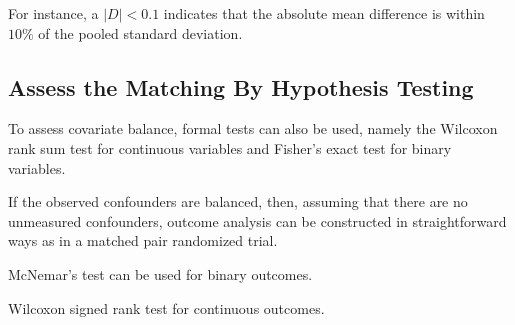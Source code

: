 For instance, a $|D| < 0.1$ indicates that the absolute mean
difference is within $10\%$ of the pooled standard deviation.

\subsection{Assess the Matching By Hypothesis Testing}
To assess covariate balance, formal tests can also be used,
namely the Wilcoxon rank sum test for continuous variables and
Fisher's exact test for binary variables.

If the observed confounders are balanced, then, assuming that
there are no unmeasured confounders, outcome analysis can be
constructed in straightforward ways as in a matched pair
randomized trial.

McNemar's test can be used for binary outcomes.

Wilcoxon signed rank test for continuous outcomes.
